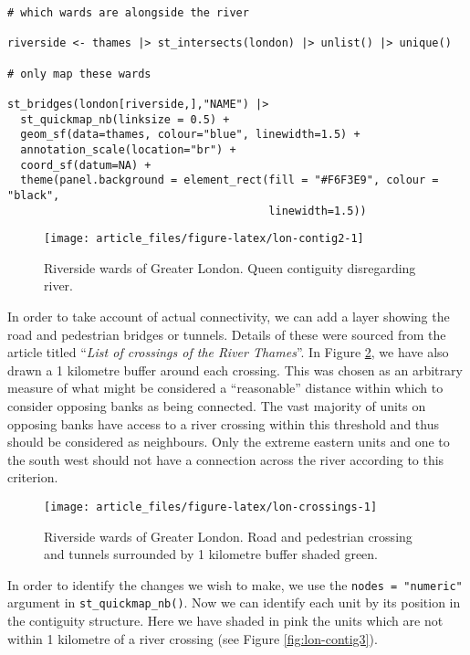 \begin{verbatim}
# which wards are alongside the river

riverside <- thames |> st_intersects(london) |> unlist() |> unique()

# only map these wards

st_bridges(london[riverside,],"NAME") |>
  st_quickmap_nb(linksize = 0.5) +
  geom_sf(data=thames, colour="blue", linewidth=1.5) +
  annotation_scale(location="br") +
  coord_sf(datum=NA) +
  theme(panel.background = element_rect(fill = "#F6F3E9", colour = "black",
                                        linewidth=1.5))
\end{verbatim}

\begin{figure}

{\centering \texttt{[image: article\_files/figure-latex/lon-contig2-1]} 

}

\caption{Riverside wards of Greater London. Queen contiguity disregarding river. }\label{fig:lon-contig2}
\end{figure}

In order to take account of actual connectivity, we can add a layer showing the road and pedestrian bridges or tunnels. Details of these were sourced from the \citet{wikicrossings} article titled ``\emph{List of crossings of the River Thames}''. In Figure \ref{fig:lon-crossings}, we have also drawn a 1 kilometre buffer around each crossing. This was chosen as an arbitrary measure of what might be considered a ``reasonable'' distance within which to consider opposing banks as being connected. The vast majority of units on opposing banks have access to a river crossing within this threshold and thus should be considered as neighbours. Only the extreme eastern units and one to the south west should not have a connection across the river according to this criterion.

\begin{figure}

{\centering \texttt{[image: article\_files/figure-latex/lon-crossings-1]} 

}

\caption{Riverside wards of Greater London. Road and pedestrian crossing and tunnels surrounded by 1 kilometre buffer shaded green. }\label{fig:lon-crossings}
\end{figure}

In order to identify the changes we wish to make, we use the
\texttt{nodes\ =\ "numeric"} argument in \texttt{st\_quickmap\_nb()}. Now we can identify
each unit by its position in the contiguity structure. Here we have
shaded in pink the units which are not within 1 kilometre of a river
crossing (see Figure \ref{fig:lon-contig3}).

